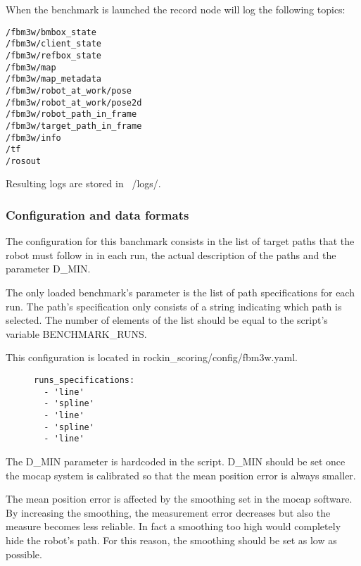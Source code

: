 \documentclass[a4paper]{article}
\begin{document}
\label{sec:fbm3w_record_node}

When the benchmark is launched the record node will log the following topics:

\begin{verbatim}
/fbm3w/bmbox_state
/fbm3w/client_state
/fbm3w/refbox_state
/fbm3w/map
/fbm3w/map_metadata
/fbm3w/robot_at_work/pose
/fbm3w/robot_at_work/pose2d
/fbm3w/robot_path_in_frame
/fbm3w/target_path_in_frame
/fbm3w/info
/tf
/rosout
\end{verbatim} 

Resulting logs are stored in ~/logs/.

\clearpage

\subsubsection{Configuration and data formats}

The configuration for this banchmark consists in the list of target paths that the robot must follow in in each run, the actual description of the paths and the parameter D\_MIN.

\label{sec:fbm3w_parameters_format}

The only loaded benchmark's parameter is the list of path specifications for each run.
The path's specification only consists of a string indicating which path is selected.
The number of elements of the list should be equal to the script's variable BENCHMARK\_RUNS.

This configuration is located in rockin\_scoring/config/fbm3w.yaml.

\begin{figure}[h!]
	\noindent
	\begin{minipage}[t!]{\linewidth}
		\begin{lstlisting}[caption=fbm3w.yaml]
runs_specifications:
  - 'line'
  - 'spline'
  - 'line'
  - 'spline'
  - 'line'
    \end{lstlisting}
	\end{minipage}
\end{figure}

The D\_MIN parameter is hardcoded in the script.
D\_MIN should be set once the mocap system is calibrated so that the mean position error is always smaller.

The mean position error is affected by the smoothing set in the mocap software.
By increasing the smoothing, the measurement error decreases but also the measure becomes less reliable.
In fact a smoothing too high would completely hide the robot's path.
For this reason, the smoothing should be set as low as possible.
\end{document}
